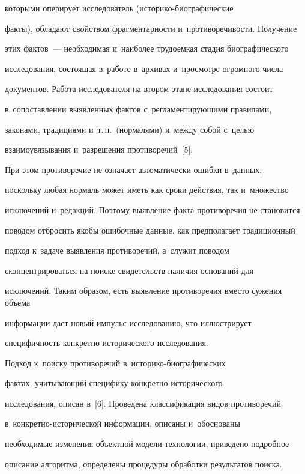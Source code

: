 которыми оперирует исследователь (ис\-то\-ри\-ко-био\-гра\-фи\-че\-ские 


факты), обладают свойством фрагментарности и~противоречивости. Получение 


этих фактов~--- необходимая и~наиболее трудоемкая стадия биографического 


исследования, состоящая в~работе в~архивах и~просмотре огромного числа 


документов. Работа исследователя на втором этапе исследования состоит 


в~сопоставлении выявленных фактов с~регламентирующими правилами, 


законами, традициями и~т.\,п.\ (нормалями) и~между собой с~целью 


взаимоувязывания и~разрешения противоречий~[5]. 




  При этом противоречие не означает автоматически ошибки в~данных, 


поскольку любая нормаль может иметь как сроки действия, так и~множество 


исключений и~редакций. Поэтому выявление факта противоречия не становится 


поводом отбросить якобы ошибочные данные, как предполагает традиционный 


подход к~задаче выявления противоречий, а~служит поводом 


сконцентрироваться на поиске свидетельств наличия оснований для 


исключений. Таким образом, есть выявление противоречия вместо сужения объема 


информации дает новый импульс исследованию, что иллюстрирует 


специфичность кон\-крет\-но-ис\-то\-ри\-че\-ско\-го исследования.


  


  Подход к~поиску противоречий в~ис\-то\-ри\-ко-био\-гра\-фи\-че\-ских 


фактах, учитывающий специфику кон\-крет\-но-ис\-то\-ри\-че\-ско\-го 


исследования, описан в~[6]. Проведена классификация видов противоречий 


в~кон\-крет\-но-ис\-то\-ри\-че\-ской информации, описаны и~обоснованы 


необходимые изменения объектной модели технологии, приведено подробное 


описание алгоритма, определены процедуры обработки результатов поиска. 


